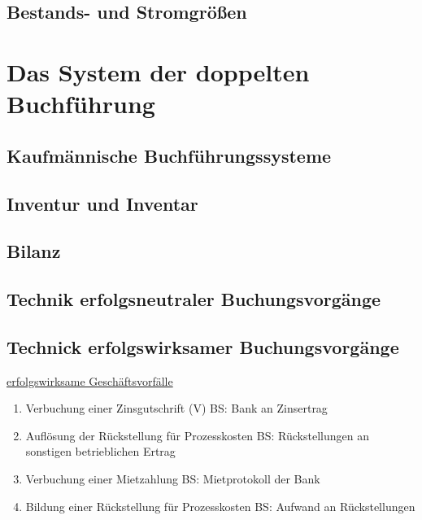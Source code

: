 \documentclass[paper=a4, fontsize=11pt]{scrartcl}
\numberwithin{equation}{section}
\numberwithin{figure}{section}
\numberwithin{table}{section}
\begin{document}
\subsection{Bestands- und Stromgrößen}


\newpage

\section{Das System der doppelten Buchführung}


\subsection{Kaufmännische Buchführungssysteme}


\subsection{Inventur und Inventar}


\subsection{Bilanz}


\subsection{Technik erfolgsneutraler Buchungsvorgänge}


\subsection{Technick erfolgswirksamer Buchungsvorgänge}

\underline{erfolgswirksame Geschäftsvorfälle}

\begin{enumerate}
\item Verbuchung einer Zinsgutschrift (V)
BS: Bank an Zinsertrag
\item Auflösung der Rückstellung für Prozesskosten
BS: Rückstellungen an sonstigen betrieblichen Ertrag
\item Verbuchung einer Mietzahlung
BS: Mietprotokoll der Bank
\item Bildung einer Rückstellung für Prozesskosten
BS: Aufwand an Rückstellungen
\end{enumerate}
\end{document}
